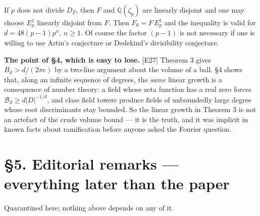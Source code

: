 \documentclass[11pt,reqno]{amsart}
\theoremstyle{plain}
\theoremstyle{definition}
\theoremstyle{remark}
\newcommand{\Q}{\mathbb{Q}}
\newcommand{\Bcal}{\mathcal{B}}
\newcommand{\Ledger}[1]{{\scriptsize\textsf{[#1]}}}
\begin{document}
If $p$ does not divide $D_F$, then $F$ and $\Q(\zeta_p)$ are linearly disjoint and one
may choose $E_p^1$ linearly disjoint from $F$. Then $F_0=F\,E_p^1$ and the inequality
is valid for $d=48(p-1)p^n$, $n\ge1$. Of course the factor $(p-1)$ is not necessary if
one is willing to use Artin's conjecture or Dedekind's divisibility conjecture.

\begin{expansion}
\textbf{The point of \S4, which is easy to lose.} \Ledger{E27} Theorem 3 gives
$B_d>d/(2\pi e)$ by a two-line argument about the volume of a ball. \S4 shows that,
along an infinite sequence of degrees, the \emph{same} linear growth is a consequence
of number theory: a field whose zeta function has a real zero forces
$\Bcal_d\ge d|D|^{-1/d}$, and class field towers produce fields of unboundedly large
degree whose root discriminants stay bounded. So the linear growth in Theorem 3 is not
an artefact of the crude volume bound --- it is the truth, and it was implicit in
known facts about ramification before anyone asked the Fourier question.
\end{expansion}

\section*{\S5. Editorial remarks --- everything later than the paper}

Quarantined here; nothing above depends on any of it.
\end{document}
